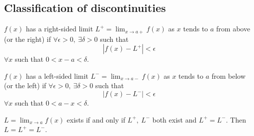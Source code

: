 \documentclass[10pt, a4paper]{article}
\begin{document}
\subsection{Classification of discontinuities}
\begin{definition}
    $f(x)$ has a right-sided limit $\displaystyle L ^ + = \lim_{x \rightarrow a+}f(x)$ as $x$ tends to $a$ from above (or the right) if
    $\forall\epsilon >0,\ \exists\delta > 0$ such that
    \[
    |f(x) - L^+| < \epsilon
    \]
    $\forall x$ such that $0 < x - a < \delta$.
\end{definition}

\begin{definition}
    $f(x)$ has a left-sided limit $\displaystyle L ^ - = \lim_{x \rightarrow a-}f(x)$ as $x$ tends to $a$ from below (or the left) if
    $\forall\epsilon >0,\ \exists\delta > 0$ such that
    \[
    |f(x) - L^-| < \epsilon
    \]
    $\forall x$ such that $0 < a - x < \delta$.
\end{definition}

$\displaystyle L = \lim_{x \rightarrow a}f(x)$ exists if and only if $L ^ +,\ L ^ -$ both exist and $L ^ + = L ^ -$. Then $L = L ^ + = L ^ -$.
\end{document}
